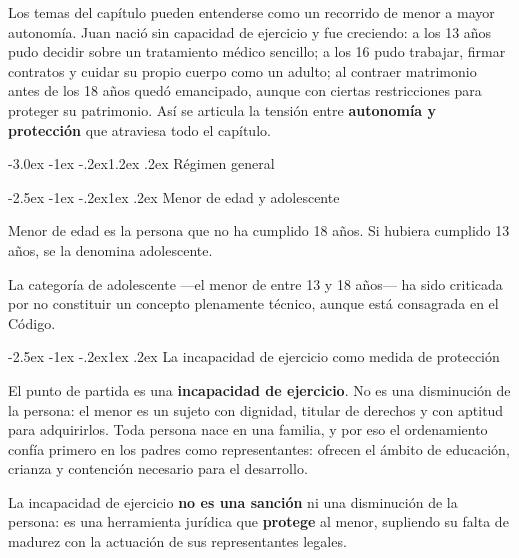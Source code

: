 \documentclass[12pt,oneside]{book}
\makeatletter
\renewcommand\section{\@startsection{section}{1}{\z@}%
  {-3.0ex \@plus -1ex \@minus -.2ex}{1.2ex \@plus .2ex}%
  {\normalfont\large\bfseries\color{acento}}}
\renewcommand\subsection{\@startsection{subsection}{2}{\z@}%
  {-2.5ex \@plus -1ex \@minus -.2ex}{1ex \@plus .2ex}%
  {\normalfont\normalsize\bfseries}}
\makeatother
\begin{document}
\begin{ejemplo}
Los temas del capítulo pueden entenderse como un recorrido de menor a mayor autonomía. Juan nació sin capacidad de ejercicio y fue creciendo: a los 13 años pudo decidir sobre un tratamiento médico sencillo; a los 16 pudo trabajar, firmar contratos y cuidar su propio cuerpo como un adulto; al contraer matrimonio antes de los 18 años quedó emancipado, aunque con ciertas restricciones para proteger su patrimonio. Así se articula la tensión entre \textbf{autonomía y protección} que atraviesa todo el capítulo.
\end{ejemplo}

\section{Régimen general}

\subsection{Menor de edad y adolescente}

\begin{regla}
Menor de edad es la persona que no ha cumplido 18 años. Si hubiera cumplido 13 años, se la denomina adolescente.
\end{regla}

La categoría de adolescente ---el menor de entre 13 y 18 años--- ha sido criticada por no constituir un concepto plenamente técnico, aunque está consagrada en el Código.

\subsection{La incapacidad de ejercicio como medida de protección}

El punto de partida es una \textbf{incapacidad de ejercicio}. No es una disminución de la persona: el menor es un sujeto con dignidad, titular de derechos y con aptitud para adquirirlos. Toda persona nace en una familia, y por eso el ordenamiento confía primero en los padres como representantes: ofrecen el ámbito de educación, crianza y contención necesario para el desarrollo.

\begin{importante}
La incapacidad de ejercicio \textbf{no es una sanción} ni una disminución de la persona: es una herramienta jurídica que \textbf{protege} al menor, supliendo su falta de madurez con la actuación de sus representantes legales.
\end{importante}
\end{document}
